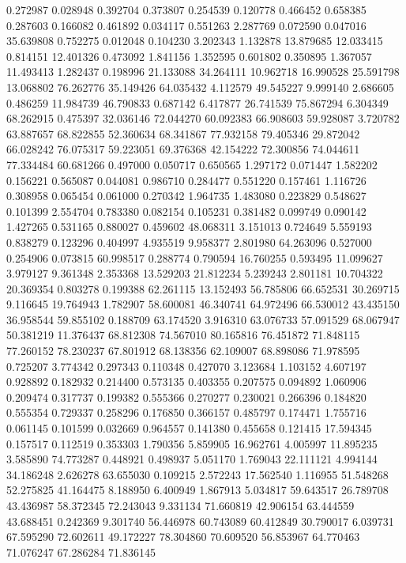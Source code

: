0.272987
0.028948
0.392704
0.373807
0.254539
0.120778
0.466452
0.658385
0.287603
0.166082
0.461892
0.034117
0.551263
2.287769
0.072590
0.047016
35.639808
0.752275
0.012048
0.104230
3.202343
1.132878
13.879685
12.033415
0.814151
12.401326
0.473092
1.841156
1.352595
0.601802
0.350895
1.367057
11.493413
1.282437
0.198996
21.133088
34.264111
10.962718
16.990528
25.591798
13.068802
76.262776
35.149426
64.035432
4.112579
49.545227
9.999140
2.686605
0.486259
11.984739
46.790833
0.687142
6.417877
26.741539
75.867294
6.304349
68.262915
0.475397
32.036146
72.044270
60.092383
66.908603
59.928087
3.720782
63.887657
68.822855
52.360634
68.341867
77.932158
79.405346
29.872042
66.028242
76.075317
59.223051
69.376368
42.154222
72.300856
74.044611
77.334484
60.681266
0.497000
0.050717
0.650565
1.297172
0.071447
1.582202
0.156221
0.565087
0.044081
0.986710
0.284477
0.551220
0.157461
1.116726
0.308958
0.065454
0.061000
0.270342
1.964735
1.483080
0.223829
0.548627
0.101399
2.554704
0.783380
0.082154
0.105231
0.381482
0.099749
0.090142
1.427265
0.531165
0.880027
0.459602
48.068311
3.151013
0.724649
5.559193
0.838279
0.123296
0.404997
4.935519
9.958377
2.801980
64.263096
0.527000
0.254906
0.073815
60.998517
0.288774
0.790594
16.760255
0.593495
11.099627
3.979127
9.361348
2.353368
13.529203
21.812234
5.239243
2.801181
10.704322
20.369354
0.803278
0.199388
62.261115
13.152493
56.785806
66.652531
30.269715
9.116645
19.764943
1.782907
58.600081
46.340741
64.972496
66.530012
43.435150
36.958544
59.855102
0.188709
63.174520
3.916310
63.076733
57.091529
68.067947
50.381219
11.376437
68.812308
74.567010
80.165816
76.451872
71.848115
77.260152
78.230237
67.801912
68.138356
62.109007
68.898086
71.978595
0.725207
3.774342
0.297343
0.110348
0.427070
3.123684
1.103152
4.607197
0.928892
0.182932
0.214400
0.573135
0.403355
0.207575
0.094892
1.060906
0.209474
0.317737
0.199382
0.555366
0.270277
0.230021
0.266396
0.184820
0.555354
0.729337
0.258296
0.176850
0.366157
0.485797
0.174471
1.755716
0.061145
0.101599
0.032669
0.964557
0.141380
0.455658
0.121415
17.594345
0.157517
0.112519
0.353303
1.790356
5.859905
16.962761
4.005997
11.895235
3.585890
74.773287
0.448921
0.498937
5.051170
1.769043
22.111121
4.994144
34.186248
2.626278
63.655030
0.109215
2.572243
17.562540
1.116955
51.548268
52.275825
41.164475
8.188950
6.400949
1.867913
5.034817
59.643517
26.789708
43.436987
58.372345
72.243043
9.331134
71.660819
42.906154
63.444559
43.688451
0.242369
9.301740
56.446978
60.743089
60.412849
30.790017
6.039731
67.595290
72.602611
49.172227
78.304860
70.609520
56.853967
64.770463
71.076247
67.286284
71.836145
